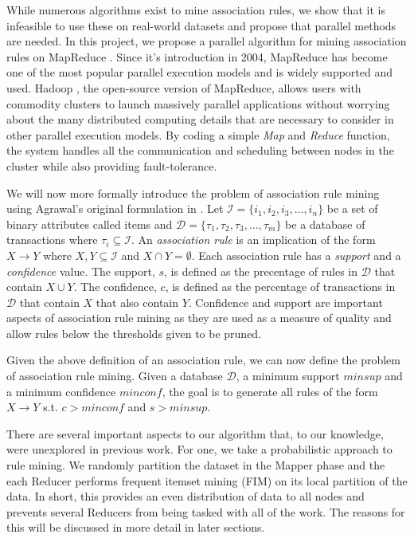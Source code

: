 \documentclass[11pt]{article}
\begin{document}
While numerous algorithms exist to mine association rules, we show
that it is infeasible to use these on real-world datasets and propose
that parallel methods are needed. In this project, we propose a
parallel algorithm for mining association rules on MapReduce
\cite{Dean2008}.
 Since it's introduction in 2004, MapReduce has become one
of the most popular parallel execution models and is widely supported
and used. Hadoop , the open-source version of MapReduce, allows users
with commodity clusters to launch massively parallel applications
without worrying about the many distributed computing details that are
necessary to consider in other parallel execution models. By coding a
simple \emph{Map} and \emph{Reduce} function, the system handles all
the communication and scheduling between nodes in the cluster while
also providing fault-tolerance. 

We will now more formally introduce the problem of association rule
mining using Agrawal's original formulation in \cite{Agrawal1}. Let
$\mathcal{I} = \{i_1, i_2, i_3, \ldots, i_n\}$ be a set of binary
attributes called items and $\mathcal{D} = \{\tau_1, \tau_2, \tau_3,
  \ldots, \tau_m\}$ be a database of transactions where $\tau_i \subseteq
\mathcal{I}$. An \emph{association rule} is an implication of the form
$X \rightarrow Y$ where $X,Y \subseteq \mathcal{I}$ and $X \cap Y =
\emptyset$. Each association rule has a \emph{support} and a
\emph{confidence} value. The support, $s$, is defined as the
precentage of rules in $\mathcal{D}$ that contain $X \cup Y$. The
confidence, $c$, is defined as the percentage of transactions in
$\mathcal{D}$ that contain $X$ that also contain $Y$. Confidence and
support are important aspects of association rule mining as they are
used as a measure of quality and allow rules below the thresholds
given to be pruned. 

Given the above definition of an association rule, we can now define
the problem of association rule mining. Given a database
$\mathcal{D}$, a minimum support $minsup$ and a minimum confidence
$minconf$, the goal is to generate all rules of the form $X
\rightarrow Y$ s.t. $c > minconf$ and $s > minsup$. 

There are several important aspects to our algorithm that, to our
knowledge, were unexplored in previous work. For one, we take a
probabilistic approach to rule mining. We randomly partition the
dataset in the Mapper phase and the each Reducer performs frequent
itemset mining (FIM) on its local partition of the data. In short, this
provides an even distribution of data to all nodes and prevents
several Reducers from being tasked with all of the work. The reasons
for this will be discussed in more detail in later sections.
\end{document}
